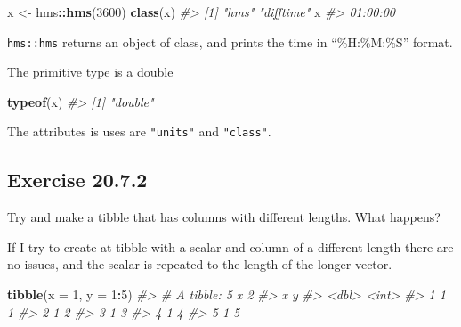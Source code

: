 \documentclass[]{book}
\newenvironment{Shaded}{\begin{snugshade}}{\end{snugshade}}
\newcommand{\CommentTok}[1]{\textcolor[rgb]{0.56,0.35,0.01}{\textit{#1}}}
\newcommand{\DataTypeTok}[1]{\textcolor[rgb]{0.13,0.29,0.53}{#1}}
\newcommand{\DecValTok}[1]{\textcolor[rgb]{0.00,0.00,0.81}{#1}}
\newcommand{\KeywordTok}[1]{\textcolor[rgb]{0.13,0.29,0.53}{\textbf{#1}}}
\newcommand{\NormalTok}[1]{#1}
\newcommand{\OperatorTok}[1]{\textcolor[rgb]{0.81,0.36,0.00}{\textbf{#1}}}
\newcommand{\StringTok}[1]{\textcolor[rgb]{0.31,0.60,0.02}{#1}}
\theoremstyle{plain}
\theoremstyle{remark}
\theoremstyle{definition}
\theoremstyle{definition}
\theoremstyle{definition}
\theoremstyle{remark}
\begin{document}
\begin{Shaded}
\begin{Highlighting}[]
\NormalTok{x <-}\StringTok{ }\NormalTok{hms}\OperatorTok{::}\KeywordTok{hms}\NormalTok{(}\DecValTok{3600}\NormalTok{)}
\KeywordTok{class}\NormalTok{(x)}
\CommentTok{#> [1] "hms"      "difftime"}
\NormalTok{x}
\CommentTok{#> 01:00:00}
\end{Highlighting}
\end{Shaded}

\texttt{hms::hms} returns an object of class, and prints the time in
``\%H:\%M:\%S'' format.

The primitive type is a double

\begin{Shaded}
\begin{Highlighting}[]
\KeywordTok{typeof}\NormalTok{(x)}
\CommentTok{#> [1] "double"}
\end{Highlighting}
\end{Shaded}

The attributes is uses are \texttt{"units"} and \texttt{"class"}.

\begin{Shaded}
\end{Shaded}

\hypertarget{exercise-20.7.2}{%
\subsection*{\texorpdfstring{Exercise
{20.7.2}}{Exercise 20.7.2}}\label{exercise-20.7.2}}

Try and make a tibble that has columns with different lengths. What
happens?

If I try to create at tibble with a scalar and column of a different
length there are no issues, and the scalar is repeated to the length of
the longer vector.

\begin{Shaded}
\begin{Highlighting}[]
\KeywordTok{tibble}\NormalTok{(}\DataTypeTok{x =} \DecValTok{1}\NormalTok{, }\DataTypeTok{y =} \DecValTok{1}\OperatorTok{:}\DecValTok{5}\NormalTok{)}
\CommentTok{#> # A tibble: 5 x 2}
\CommentTok{#>       x     y}
\CommentTok{#>   <dbl> <int>}
\CommentTok{#> 1     1     1}
\CommentTok{#> 2     1     2}
\CommentTok{#> 3     1     3}
\CommentTok{#> 4     1     4}
\CommentTok{#> 5     1     5}
\end{Highlighting}
\end{Shaded}
\end{document}
